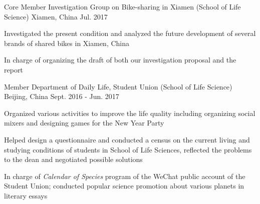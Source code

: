 


\begin{cventries}




\cventry
{Core Member} %
{Investigation Group on Bike-sharing in Xiamen (School of Life Science)} %
{Xiamen, China} %
{Jul. 2017} %
{ %
\begin{cvitems}
\item {Investigated the present condition and analyzed the future development of several brands of shared bikes in Xiamen, China}
\item {In charge of organizing the draft of both our investigation proposal and the report}
\end{cvitems}
}


\cventry
{Member} %
{Department of Daily Life, Student Union (School of Life Science)} %
{Beijing, China} %
{Sept. 2016 - Jun. 2017} %
{ %
\begin{cvitems}
\item {Organized various activities to improve the life quality including organizing social mixers and designing games for the New Year Party}
\item {Helped design a questionnaire and conducted a census on the current living and studying conditions of students in School of Life Sciences, reflected the problems to the dean and negotiated possible solutions}
\item {In charge of \textit{Calendar of Species} program of the WeChat public account of the Student Union; conducted popular science promotion about various planets in literary essays}
\end{cvitems}
}


\end{cventries}